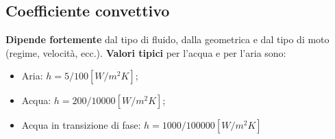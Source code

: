 \subsection{Coefficiente convettivo}
\textbf{Dipende fortemente} dal tipo di fluido, dalla geometrica e dal tipo di moto (regime, velocità, ecc.).\newline
\newline
\textbf{Valori tipici} per l'acqua e per l'aria sono:
\begin{itemize}
    \item Aria: $h = 5/ 100 [W/m^2K]$;
    \item Acqua: $h = 200/10000 [W/m^2K]$;
    \item Acqua in transizione di fase: $h = 1000/100000 [W/m^2K]$
\end{itemize}
